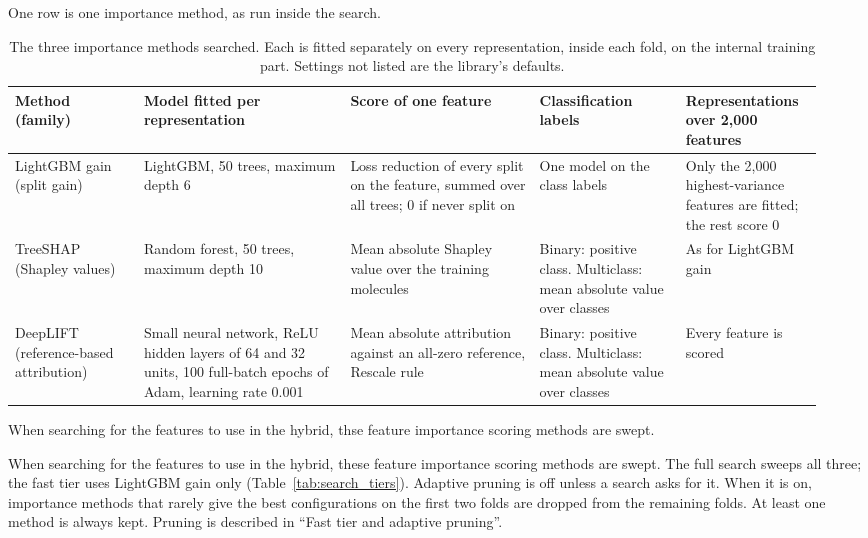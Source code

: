 One row is one importance method, as run inside the search.
\begin{table}[htbp]
\centering
\caption[The three importance methods searched.]{The three importance methods searched. Each is fitted separately on every representation, inside each fold, on the internal training part. Settings not listed are the library's defaults.}
\label{tab:importance_methods}
\small
\begin{adjustbox}{max width=\textwidth}
\begin{tabular}{@{}P{0.15\linewidth}P{0.24\linewidth}P{0.22\linewidth}P{0.17\linewidth}P{0.16\linewidth}@{}}
\toprule
Method (family) & Model fitted per representation & Score of one feature & Classification labels & Representations over 2{,}000 features \\
\midrule
LightGBM gain (split gain) & LightGBM, 50 trees, maximum depth 6 & Loss reduction of every split on the feature, summed over all trees; 0 if never split on & One model on the class labels & Only the 2{,}000 highest-variance features are fitted; the rest score 0 \\
TreeSHAP (Shapley values) & Random forest, 50 trees, maximum depth 10 & Mean absolute Shapley value over the training molecules & Binary: positive class. Multiclass: mean absolute value over classes & As for LightGBM gain \\
DeepLIFT (reference-based attribution) & Small neural network, ReLU hidden layers of 64 and 32 units, 100 full-batch epochs of Adam, learning rate 0.001 & Mean absolute attribution against an all-zero reference, Rescale rule & Binary: positive class. Multiclass: mean absolute value over classes & Every feature is scored \\
\bottomrule
\end{tabular}
\end{adjustbox}
\end{table}

When searching for the features to use in the hybrid, thse feature importance scoring methods are swept.

When searching for the features to use in the hybrid, these feature importance scoring methods are swept. The full search sweeps all three; the fast tier uses LightGBM gain only (Table~\ref{tab:search_tiers}). Adaptive pruning is off unless a search asks for it. When it is on, importance methods that rarely give the best configurations on the first two folds are dropped from the remaining folds. At least one method is always kept. Pruning is described in ``Fast tier and adaptive pruning''.

